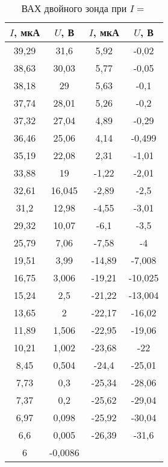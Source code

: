 \begin{table}[h!]
    \centering
    \begin{tabular}{|c|c|c|c|}
    \hline
    $I$, мкА & $U$, В   & $I$, мкА & $U$, В    \\ \hline
    39,29    & 31,6     & 5,92     & -0,02     \\ \hline
    38,63    & 30,03    & 5,77     & -0,05     \\ \hline
    38,18    & 29       & 5,63     & -0,1      \\ \hline
    37,74    & 28,01    & 5,26     & -0,2      \\ \hline
    37,32    & 27,04    & 4,89     & -0,29     \\ \hline
    36,46    & 25,06    & 4,14     & -0,499    \\ \hline
    35,19    & 22,08    & 2,31     & -1,01     \\ \hline
    33,88    & 19       & -1,22    & -2,01     \\ \hline
    32,61    & 16,045   & -2,89    & -2,5      \\ \hline
    31,2     & 12,98    & -4,55    & -3,01     \\ \hline
    29,32    & 10,07    & -6,1     & -3,5      \\ \hline
    25,79    & 7,06     & -7,58    & -4        \\ \hline
    19,51    & 3,99     & -14,89   & -7,008    \\ \hline
    16,75    & 3,006    & -19,21   & -10,025   \\ \hline
    15,24    & 2,5      & -21,22   & -13,004   \\ \hline
    13,65    & 2        & -22,17   & -16,02    \\ \hline
    11,89    & 1,506    & -22,95   & -19,06    \\ \hline
    10,21    & 1,002    & -23,68   & -22       \\ \hline
    8,45     & 0,504    & -24,4    & -25,01    \\ \hline
    7,73     & 0,3      & -25,34   & -28,06    \\ \hline
    7,37     & 0,2      & -25,62   & -29,04    \\ \hline
    6,97     & 0,098    & -25,92   & -30,04    \\ \hline
    6,6      & 0,005    & -26,39   & -31,6     \\ \hline
    6        & -0,0086  &          &           \\ \hline
    \end{tabular}
    \caption{ВАХ двойного зонда при $I = $}
    \label{VAC4}
\end{table}